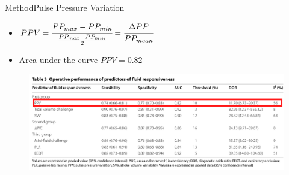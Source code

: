 \documentclass{beamer}
\begin{document}
			\begin{frame}{Method}{Pulse Pressure Variation}
				\begin{itemize}
					\item $PPV=\cfrac{PP_{max}-PP_{min}}{\frac{PP_{max}-PP_{min}}{2}}=\cfrac{\Delta PP}{PP_{mean}}$
					\item Area under the curve $PPV=0.82$ \cite{AlvaradoSanchez2021}
				\end{itemize}
				\begin{figure}
					\centering
					\includegraphics[width=0.9\linewidth]{figures/responsivenessMethodsCompared-1}
					\label{fig:responsivenessmethodscompared-1}
				\end{figure}
			\end{frame}
\end{document}
